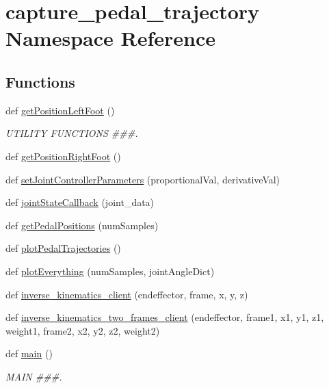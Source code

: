 \hypertarget{namespacecapture__pedal__trajectory}{}\section{capture\+\_\+pedal\+\_\+trajectory Namespace Reference}
\label{namespacecapture__pedal__trajectory}
\subsection*{Functions}
\begin{DoxyCompactItemize}
\item 
def \mbox{\hyperlink{namespacecapture__pedal__trajectory_a8d1d532a39c3c5a5efe8d6110ecd1723}{get\+Position\+Left\+Foot}} ()
\begin{DoxyCompactList}\small\item\em U\+T\+I\+L\+I\+TY F\+U\+N\+C\+T\+I\+O\+NS \#\#\#. \end{DoxyCompactList}\item 
def \mbox{\hyperlink{namespacecapture__pedal__trajectory_abd2b89d215476e10e9079f6f971a669c}{get\+Position\+Right\+Foot}} ()
\item 
def \mbox{\hyperlink{namespacecapture__pedal__trajectory_a00dff2df306072da5d299eba96e79b4b}{set\+Joint\+Controller\+Parameters}} (proportional\+Val, derivative\+Val)
\item 
def \mbox{\hyperlink{namespacecapture__pedal__trajectory_ac931a7ae623a2c8c8df34da551639cce}{joint\+State\+Callback}} (joint\+\_\+data)
\item 
def \mbox{\hyperlink{namespacecapture__pedal__trajectory_a73fc41de533fbb350b426e9c08886203}{get\+Pedal\+Positions}} (num\+Samples)
\item 
def \mbox{\hyperlink{namespacecapture__pedal__trajectory_ab92d9c5ee601a8497311ab922392e027}{plot\+Pedal\+Trajectories}} ()
\item 
def \mbox{\hyperlink{namespacecapture__pedal__trajectory_a54694682225635fb5a735f159e9f059c}{plot\+Everything}} (num\+Samples, joint\+Angle\+Dict)
\item 
def \mbox{\hyperlink{namespacecapture__pedal__trajectory_affbe4020d535c4967511b40d3aef141d}{inverse\+\_\+kinematics\+\_\+client}} (endeffector, frame, x, y, z)
\item 
def \mbox{\hyperlink{namespacecapture__pedal__trajectory_af4a490afbf4bfcafcd9d2d733ea5fac1}{inverse\+\_\+kinematics\+\_\+two\+\_\+frames\+\_\+client}} (endeffector, frame1, x1, y1, z1, weight1, frame2, x2, y2, z2, weight2)
\item 
def \mbox{\hyperlink{namespacecapture__pedal__trajectory_ae43bcee5928a71a9e44c3400a772a161}{main}} ()
\begin{DoxyCompactList}\small\item\em M\+A\+IN \#\#\#. \end{DoxyCompactList}\end{DoxyCompactItemize}
